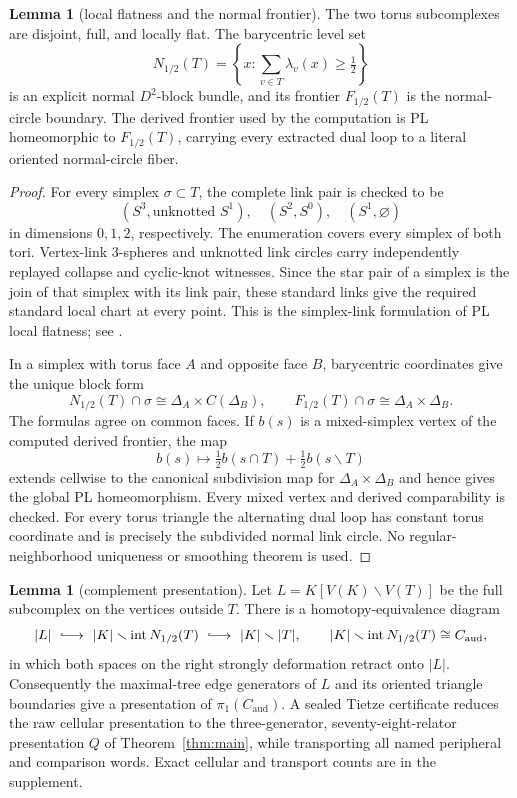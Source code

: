 \documentclass[11pt]{article}
\newcommand{\pione}{\pi_1}
\theoremstyle{definition}
\newtheorem{lemma}[theorem]{Lemma}
\begin{document}
\begin{lemma}[local flatness and the normal frontier]\label{lem:normal}
The two torus subcomplexes are disjoint, full, and locally flat.  The
barycentric level set
\[
 N_{1/2}(T)=\left\{x:\sum_{v\in T}\lambda_v(x)\geq\tfrac12\right\}
\]
is an explicit normal $D^2$-block bundle, and its frontier
$F_{1/2}(T)$ is the normal-circle boundary.  The derived frontier used by
the computation is PL homeomorphic to $F_{1/2}(T)$, carrying every extracted
dual loop to a literal oriented normal-circle fiber.
\end{lemma}

\begin{proof}
For every simplex $\sigma\subset T$, the complete link pair is checked to
be
\[
 (S^3,\text{unknotted }S^1),\quad(S^2,S^0),\quad
 (S^1,\varnothing)
\]
in dimensions $0,1,2$, respectively.  The enumeration covers every simplex
of both tori.  Vertex-link $3$-spheres and
unknotted link circles carry independently replayed collapse and cyclic-knot
witnesses.  Since the star pair of a simplex is the join of that simplex with
its link pair, these standard links give the required standard local chart at
every point.  This is the simplex-link formulation of PL local flatness; see
\cite[Chapter~4, pp.~50--51]{RourkeSanderson}.

In a simplex with torus face $A$ and opposite face $B$, barycentric
coordinates give the unique block form
\[
 N_{1/2}(T)\cap\sigma\cong\Delta_A\times C(\Delta_B),
 \qquad F_{1/2}(T)\cap\sigma\cong\Delta_A\times\Delta_B.
\]
The formulas agree on common faces.  If $b(s)$ is a mixed-simplex vertex of
the computed derived frontier, the map
\[
 b(s)\longmapsto\tfrac12b(s\cap T)+\tfrac12b(s\smallsetminus T)
\]
extends cellwise to the canonical subdivision map for
$\Delta_A\times\Delta_B$ and hence gives the global PL homeomorphism.  Every
mixed vertex and derived comparability is checked.  For every torus triangle the alternating dual loop has
constant torus coordinate and is precisely the subdivided normal link
circle.  No regular-neighborhood uniqueness or smoothing theorem is used.
\end{proof}

\begin{lemma}[complement presentation]\label{lem:complement}
Let $L=K[V(K)\smallsetminus V(T)]$ be the full subcomplex on the vertices
outside $T$.  There is a homotopy-equivalence diagram
\[
 |L|\ \lhook\joinrel\longrightarrow\
 |K|\smallsetminus\operatorname{int}N_{1/2}(T)\
 \lhook\joinrel\longrightarrow\ |K|\smallsetminus|T|,
 \qquad
 |K|\smallsetminus\operatorname{int}N_{1/2}(T)\cong C_{\mathrm{aud}},
\]
in which both spaces on the right strongly deformation retract onto $|L|$.
Consequently the maximal-tree edge generators of $L$ and its oriented
triangle boundaries give a presentation of
$\pione(C_{\mathrm{aud}})$.  A sealed Tietze certificate reduces the raw
cellular presentation to the three-generator, seventy-eight-relator
presentation $Q$ of Theorem~\ref{thm:main}, while transporting all named
peripheral and comparison words.  Exact cellular and transport counts are in
the supplement.
\end{lemma}
\end{document}
